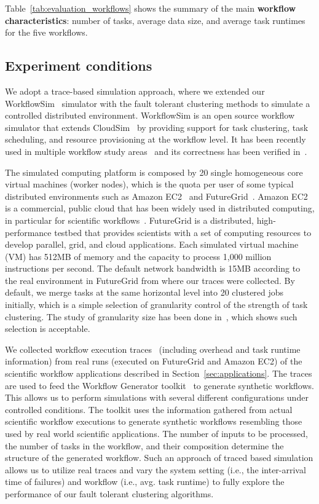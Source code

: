\documentclass{IOS-Book-Article}
\begin{document}
Table~\ref{tab:evaluation_workflows} shows the summary of the main \textbf{workflow characteristics}: number of tasks, average data size, and average task runtimes for the five workflows. 


\subsection{Experiment conditions}
\label{sec:experiment_conditions}
We adopt a trace-based simulation approach, where we extended our WorkflowSim~\cite{WorkflowSim} simulator with the fault tolerant clustering methods to simulate a controlled distributed environment. WorkflowSim is an open source workflow simulator that extends CloudSim~\cite{Calheiros2011} by providing support for task clustering, task scheduling, and resource provisioning at the workflow level. It has been recently used in multiple workflow study areas~\cite{WorkflowSim,Chen2012, jrad2013broker} and its correctness has been verified in~\cite{WorkflowSim}. 

The simulated computing platform is composed by 20 single homogeneous core virtual machines (worker nodes), which is the quota per user of some typical distributed environments such as Amazon EC2~\cite{AmazonAWS} and FutureGrid~\cite{FutureGrid}. Amazon EC2 is a commercial, public cloud that has been widely used in distributed computing, in particular for scientific workflows~\cite{Berriman2010}. FutureGrid is a distributed, high-performance testbed that provides scientists with a set of computing resources to develop parallel, grid, and cloud applications. Each simulated virtual machine (VM) has 512MB of memory and the capacity to process 1,000 million instructions per second. The default network bandwidth is 15MB according to the real environment in FutureGrid from where our traces were collected. By default, we merge tasks at the same horizontal level into 20 clustered jobs initially, which is a simple selection of granularity control of the strength of task clustering. The study of granularity size has been done in~\cite{Chen2013b}, which shows such selection is acceptable.

We collected workflow execution traces~\cite{Juve2013, Chen2011} (including overhead and task runtime information) from real runs (executed on FutureGrid and Amazon EC2) of the scientific workflow applications described in Section~\ref{sec:applications}. The traces are used to feed the Workflow Generator toolkit~\cite{WorkflowGenerator} to generate synthetic workflows. This allows us to perform simulations with several different configurations under controlled conditions. The toolkit uses the information gathered from actual scientific workflow executions to generate synthetic workflows resembling those used by real world scientific applications. The number of inputs to be processed, the number of tasks in the workflow, and their composition determine the structure of the generated workflow. Such an approach of traced based simulation allows us to utilize real traces and vary the system setting (i.e., the inter-arrival time of failures) and workflow (i.e., avg. task runtime) to fully explore the performance of our fault tolerant clustering algorithms. 
\end{document}
